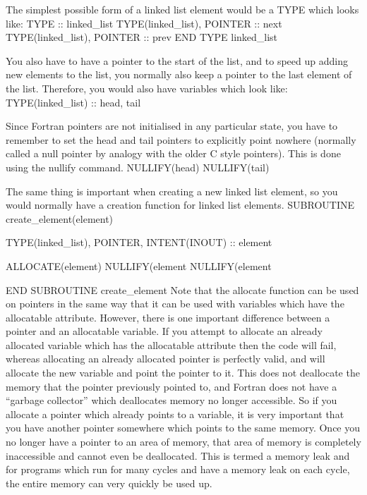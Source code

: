 \documentclass[12pt,a4paper]{article}
\newenvironment{boxverbatim}{\lboxverbatim{none}}{\endlboxverbatim}
\begin{document}
The simplest possible form of a linked list element would be a TYPE which
looks like:
\begin{boxverbatim}
TYPE :: linked_list
  TYPE(linked_list), POINTER :: next
  TYPE(linked_list), POINTER :: prev
END TYPE linked_list
\end{boxverbatim}

You also have to have a pointer to the start of the list, and to speed up
adding new elements to the list, you normally also keep a pointer to the
last element of the list. Therefore, you would also have variables which look
like:
\begin{boxverbatim}
TYPE(linked_list) :: head, tail
\end{boxverbatim}

Since Fortran pointers are not initialised in any particular state, you have
to remember to set the head and tail pointers to explicitly point nowhere
(normally called a null pointer by analogy with the older C style
pointers). This is done using the nullify command.
\begin{boxverbatim}
NULLIFY(head)
NULLIFY(tail)
\end{boxverbatim}

The same thing is important when creating a new linked list element, so you
would normally have a creation function for linked list elements.
\begin{boxverbatim}
SUBROUTINE create_element(element)

  TYPE(linked_list), POINTER, INTENT(INOUT) :: element

  ALLOCATE(element)
  NULLIFY(element%
  NULLIFY(element%

END SUBROUTINE create_element
\end{boxverbatim}
Note that the allocate function can be used on pointers in the same way that
it can be used with variables which have the allocatable attribute. However,
there is one important difference between a pointer and an allocatable
variable. If you attempt to allocate an already allocated variable which has
the allocatable attribute then the code will fail, whereas allocating an
already allocated pointer is perfectly valid, and will allocate the new
variable and point the pointer to it. This does not deallocate the memory that
the pointer previously pointed to, and Fortran does not have a ``garbage
collector'' which deallocates memory no longer accessible. So if you
allocate a pointer which already points to a variable, it is very important
that you have another pointer somewhere which points to the same memory. Once
you no longer have a pointer to an area of memory, that area of memory is
completely inaccessible and cannot even be deallocated. This is termed a
memory leak and for programs which run for many cycles and have a memory leak
on each cycle, the entire memory can very quickly be used up.
\end{document}
